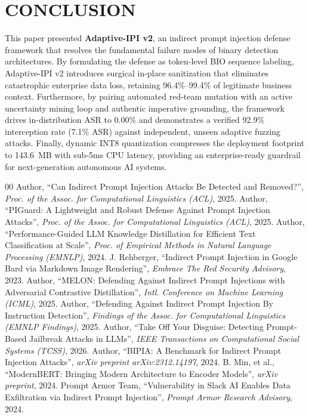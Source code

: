 \documentclass[conference]{IEEEtran}
\begin{document}
\section{CONCLUSION}

This paper presented \textbf{Adaptive-IPI v2}, an indirect prompt injection defense framework that resolves the fundamental failure modes of binary detection architectures. By formulating the defense as token-level BIO sequence labeling, Adaptive-IPI v2 introduces surgical in-place sanitization that eliminates catastrophic enterprise data loss, retaining 96.4\%--99.4\% of legitimate business context. Furthermore, by pairing automated red-team mutation with an active uncertainty mining loop and authentic imperative grounding, the framework drives in-distribution ASR to 0.00\% and demonstrates a verified 92.9\% interception rate (7.1\% ASR) against independent, unseen adaptive fuzzing attacks. Finally, dynamic INT8 quantization compresses the deployment footprint to 143.6~MB with sub-5ms CPU latency, providing an enterprise-ready guardrail for next-generation autonomous AI systems.

\begin{thebibliography}{00}
 Author, ``Can Indirect Prompt Injection Attacks Be Detected and Removed?'', \textit{Proc. of the Assoc. for Computational Linguistics (ACL)}, 2025.
 Author, ``PIGuard: A Lightweight and Robust Defense Against Prompt Injection Attacks'', \textit{Proc. of the Assoc. for Computational Linguistics (ACL)}, 2025.
 Author, ``Performance-Guided LLM Knowledge Distillation for Efficient Text Classification at Scale'', \textit{Proc. of Empirical Methods in Natural Language Processing (EMNLP)}, 2024.
 J. Rehberger, ``Indirect Prompt Injection in Google Bard via Markdown Image Rendering'', \textit{Embrace The Red Security Advisory}, 2023.
 Author, ``MELON: Defending Against Indirect Prompt Injections with Adversarial Contrastive Distillation'', \textit{Intl. Conference on Machine Learning (ICML)}, 2025.
 Author, ``Defending Against Indirect Prompt Injection By Instruction Detection'', \textit{Findings of the Assoc. for Computational Linguistics (EMNLP Findings)}, 2025.
 Author, ``Take Off Your Disguise: Detecting Prompt-Based Jailbreak Attacks in LLMs'', \textit{IEEE Transactions on Computational Social Systems (TCSS)}, 2026.
 Author, ``BIPIA: A Benchmark for Indirect Prompt Injection Attacks'', \textit{arXiv preprint arXiv:2312.14197}, 2024.
 B. Min, et al., ``ModernBERT: Bringing Modern Architecture to Encoder Models'', \textit{arXiv preprint}, 2024.
 Prompt Armor Team, ``Vulnerability in Slack AI Enables Data Exfiltration via Indirect Prompt Injection'', \textit{Prompt Armor Research Advisory}, 2024.
\end{thebibliography}
\end{document}
